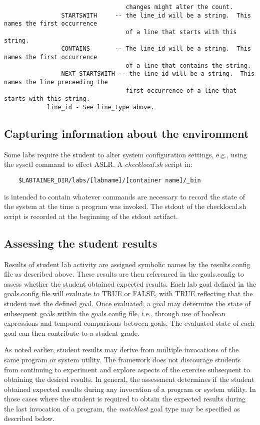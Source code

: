 \documentclass{article}
\begin{document}
\begin{verbatim}
                                  changes might alter the count.
                STARTSWITH     -- the line_id will be a string.  This names the first occurrence 
                                  of a line that starts with this string. 
                CONTAINS       -- The line_id will be a string.  This names the first occurrence 
                                  of a line that contains the string.
                NEXT_STARTSWITH -- the line_id will be a string.  This names the line preceeding the 
                                  first occurrence of a line that starts with this string. 
            line_id - See line_type above.
\end{verbatim}

\subsection{Capturing information about the environment}
Some labs require the student to alter system configuration settings,
e.g., using the sysctl command to effect ASLR. A \textit{checklocal.sh} script in:
\begin{verbatim}
    $LABTAINER_DIR/labs/[labname]/[container name]/_bin
\end{verbatim}
is intended to contain whatever commands are necessary to record the 
state of the system at the time a program was invoked.  The stdout of
the checklocal.sh script is recorded at the beginning of the stdout artifact. 

\subsection{Assessing the student results}
Results of student lab activity are assigned symbolic names by the results.config file
as described above.  These results are then referenced in the goals.config to assess whether
the student obtained expected results.  Each lab goal defined in the goals.config file
will evaluate to TRUE or FALSE, with TRUE reflecting that the student met the defined goal.
Once evaluated, a goal may determine the state of subsequent goals within the goals.config file, 
i.e., through use of boolean expressions and temporal comparisons between goals.  The evaluated
state of each goal can then contribute to a student grade.

As noted earlier, student results may derive from multiple invocations of the same program or system utility.  
The framework does not discourage students from continuing to experiment and explore aspects of the 
exercise subsequent to obtaining the desired results.  In general, the assessment determines if the student
obtained expected results during any invocation of a program or system utility.  In those cases 
where the student is required to obtain the expected results during the last invocation of a program, 
the \textit{matchlast} goal type may be specified as described below.
\end{document}
